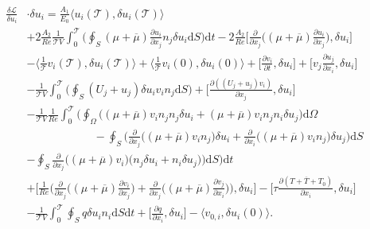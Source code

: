 \documentclass[preprint,12pt]{article}
\begin{document}
\begin{align}\begin{split}
\frac{\delta \mathcal{L}}{\delta u_i}&\cdot \delta u_i=\frac{A_1}{E_0}\Big\langle u_i(\mathcal{T}),\delta u_i(\mathcal{T}) \Big\rangle\\&+2\frac{A_2}{Re}\frac{1}{\mathcal{T}V}\int_0^\mathcal{T}\Big(\oint_S(\mu+\overline{\mu})\frac{\partial u_i}{\partial x_j}  n_j\delta u_i\text{d}S\Big)\text{d}t-2\frac{A_2}{Re}\bigg[\frac{\partial}{\partial x_j}\Big((\mu+\overline{\mu})\frac{\partial u_i}{\partial x_j}\Big),\delta u_i\bigg]\\&-\Big\langle \frac{1}{\mathcal{\mathcal{T}}}v_i(\mathcal{T}),\delta u_i(\mathcal{T})\Big\rangle+\Big\langle \frac{1}{\mathcal{\mathcal{T}}}v_i(0),\delta u_i(0)\Big\rangle+\Bigg[\frac{\partial v_i}{\partial t},\delta u_i\Bigg]+\Bigg[v_j\frac{\partial u_j}{\partial x_i},\delta u_i\Bigg]\\&-\frac{1}{\mathcal{T}V}\int_0^\mathcal{T}\Big(\oint_S(U_j+u_j)\delta u_i v_in_j \text{d}S\Big)+\Bigg[\frac{\partial ((U_j+u_j)v_i)}{\partial x_j},\delta u_i\Bigg]\\&-\frac{1}{\mathcal{T}V}\frac{1}{Re}\int_0^\mathcal{T}\Bigg(\oint_\Omega\Big(({\mu}+\overline{\mu})v_in_jn_j\delta u_i+({\mu}+\overline{\mu})v_in_jn_i\delta u_j\Big) \text{d}\Omega\\&\hspace{1in}-\oint_S\Big(\frac{\partial}{\partial x_j}\Big(({\mu}+\overline{\mu})v_in_j\Big)\delta u_i+\frac{\partial}{\partial x_i}\Big(({\mu}+\overline{\mu})v_in_j\Big)\delta u_j\Big) \text{d}S\\&-\oint_S\frac{\partial}{\partial x_j}\Big(({\mu}+\overline{\mu})v_i\Big)\Big(n_j\delta u_i+n_i\delta u_j \Big)\Big)\text{d}S\Bigg)\text{d}t\\&+\Bigg[\frac{1}{Re}\Bigg(\frac{\partial}{\partial x_j}\Big(({\mu}+\overline{\mu})\frac{\partial v_i}{\partial x_j}\Big)+\frac{\partial}{\partial x_j}\Big(({\mu}+\overline{\mu})\frac{\partial v_j}{\partial x_i}\Big)\Bigg),\delta u_i\Bigg]-\Bigg[\tau\frac{\partial (T+\overline{T}+T_0)}{\partial x_i},\delta u_i\Bigg]\\&
-\frac{1}{\mathcal{T}V}\int_0^\mathcal{T}\oint_Sq\delta u_in_i\text{d}S\text{d}t+\Bigg[\frac{\partial q}{\partial x_i},\delta u_i\Bigg]-\langle v_{0,i},\delta u_i(0)\rangle.\end{split}\end{align}
\end{document}
